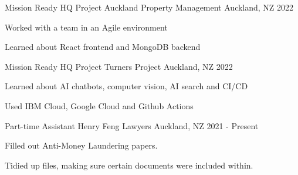 

\begin{cventries}
\cventry
{Mission Ready HQ Project} %
{Auckland Property Management} %
{Auckland, NZ} %
{2022} %
{
  \begin{cvitems} %
    \item {Worked with a team in an Agile environment}
    \item {Learned about React frontend and MongoDB backend}
  \end{cvitems}
}

\cventry
{Mission Ready HQ Project} %
{Turners Project} %
{Auckland, NZ} %
{2022} %
{
  \begin{cvitems} %
    \item {Learned about AI chatbots, computer vision, AI search and CI/CD}
    \item {Used IBM Cloud, Google Cloud and Github Actions}
  \end{cvitems}
}

  \cventry
    {Part-time Assistant} %
    {Henry Feng Lawyers} %
    {Auckland, NZ} %
    {2021 - Present} %
    {
      \begin{cvitems} %
        \item {Filled out Anti-Money Laundering papers.}
        \item {Tidied up files, making sure certain documents were included within.}
      \end{cvitems}
    }


\end{cventries}
